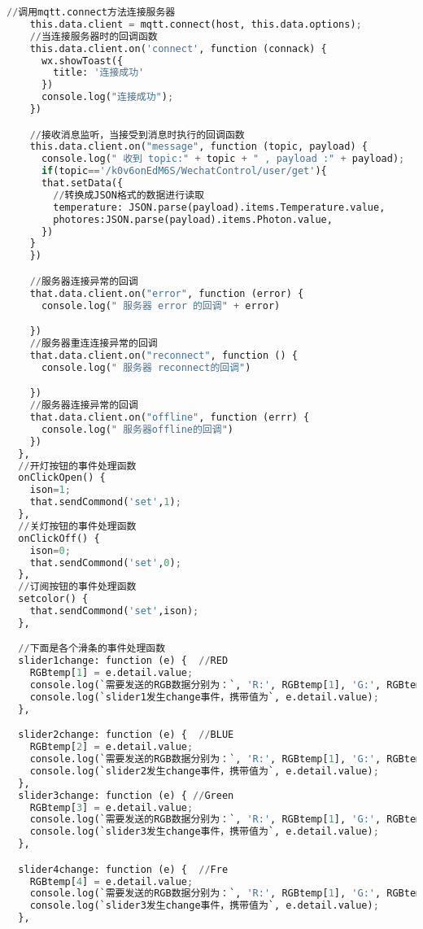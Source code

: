 \documentclass[12pt,hyperref,a4paper,UTF8]{ctexart}
\begin{document}
\begin{lstlisting}[language=python]
    //调用mqtt.connect方法连接服务器
    this.data.client = mqtt.connect(host, this.data.options);
    //当连接服务器时的回调函数
    this.data.client.on('connect', function (connack) {
      wx.showToast({
        title: '连接成功'
      })
      console.log("连接成功");
    })

    //接收消息监听，当接受到消息时执行的回调函数
    this.data.client.on("message", function (topic, payload) {
      console.log(" 收到 topic:" + topic + " , payload :" + payload);
      if(topic=='/k0v6onEdM6S/WechatControl/user/get'){
      that.setData({
        //转换成JSON格式的数据进行读取
        temperature: JSON.parse(payload).items.Temperature.value,
        photores:JSON.parse(payload).items.Photon.value,
      })
    }
    })

    //服务器连接异常的回调
    that.data.client.on("error", function (error) {
      console.log(" 服务器 error 的回调" + error)

    })
    //服务器重连连接异常的回调
    that.data.client.on("reconnect", function () {
      console.log(" 服务器 reconnect的回调")

    })
    //服务器连接异常的回调
    that.data.client.on("offline", function (errr) {
      console.log(" 服务器offline的回调")
    })
  },
  //开灯按钮的事件处理函数
  onClickOpen() {
    ison=1;
    that.sendCommond('set',1);
  },
  //关灯按钮的事件处理函数
  onClickOff() {
    ison=0;
    that.sendCommond('set',0);
  },
  //订阅按钮的事件处理函数
  setcolor() {
    that.sendCommond('set',ison);
  },

  //下面是各个滑条的事件处理函数
  slider1change: function (e) {  //RED
    RGBtemp[1] = e.detail.value;
    console.log(`需要发送的RGB数据分别为：`, 'R:', RGBtemp[1], 'G:', RGBtemp[3], 'B:', RGBtemp[2], 'fre:', RGBtemp[4]);
    console.log(`slider1发生change事件，携带值为`, e.detail.value);
  },

  slider2change: function (e) {  //BLUE
    RGBtemp[2] = e.detail.value;
    console.log(`需要发送的RGB数据分别为：`, 'R:', RGBtemp[1], 'G:', RGBtemp[3], 'B:', RGBtemp[2], 'fre:', RGBtemp[4]);
    console.log(`slider2发生change事件，携带值为`, e.detail.value);
  },
  slider3change: function (e) { //Green
    RGBtemp[3] = e.detail.value;
    console.log(`需要发送的RGB数据分别为：`, 'R:', RGBtemp[1], 'G:', RGBtemp[3], 'B:', RGBtemp[2], 'fre:', RGBtemp[4]);
    console.log(`slider3发生change事件，携带值为`, e.detail.value);
  },

  slider4change: function (e) {  //Fre
    RGBtemp[4] = e.detail.value;
    console.log(`需要发送的RGB数据分别为：`, 'R:', RGBtemp[1], 'G:', RGBtemp[3], 'B:', RGBtemp[2], 'fre:', RGBtemp[4]);
    console.log(`slider3发生change事件，携带值为`, e.detail.value);
  },


\end{lstlisting}
\end{document}
